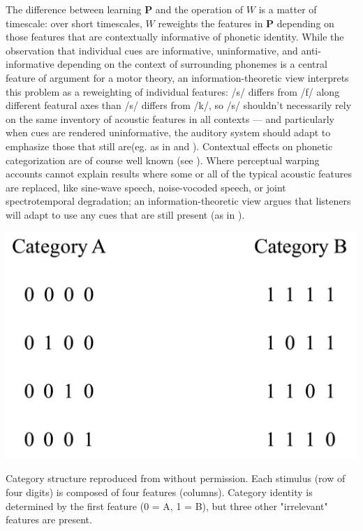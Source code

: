 The difference between learning $\mathbf{P}$ and the operation of $W$ is a matter of timescale: over short timescales, $W$ reweights the features in $\mathbf{P}$ depending on those features that are contextually informative of phonetic identity. While the observation that individual cues are informative, uninformative, and anti-informative depending on the context of surrounding phonemes is a central feature of argument for a motor theory\citep{Bailey1980}, an information-theoretic view interprets this problem as a reweighting of individual features: /s/ differs from /f/ along different featural axes than /s/ differs from /k/, so /s/ shouldn't necessarily rely on the same inventory of acoustic features in all contexts --- and particularly when cues are rendered uninformative, the auditory system should adapt to emphasize those that still are(eg. as in \citep{kiefteAbsorptionReliableSpectral2008} and \citep{kleinschmidtRobustSpeechPerception2015a}). Contextual effects on phonetic categorization are of course well known (see \citep{holtSpeechPerceptionCategorization2010}). Where perceptual warping accounts cannot explain results where some or all of the typical acoustic features are replaced, like sine-wave speech\citep{remezSpeechPerceptionTraditional1981}, noise-vocoded speech\citep{davisLexicalInformationDrives2005}, or joint spectrotemporal degradation\citep{elliottModulationTransferFunction2009a}; an information-theoretic view argues that listeners will adapt to use any cues that are still present (as in \citep{kiefteAbsorptionReliableSpectral2008}). 

\begin{marginfigure}[2.5cm]
\includegraphics[width=\linewidth]{modeling/figures/rule_based_categorization.png}
\caption{Category structure reproduced from \citep{couchmanRulesResemblanceTheir2010} without permission. Each stimulus (row of four digits) is composed of four features (columns). Category identity is determined by the first feature (0 = A, 1 = B), but three other "irrelevant" features are present.}
\label{fig:rule_based}
\end{marginfigure}

